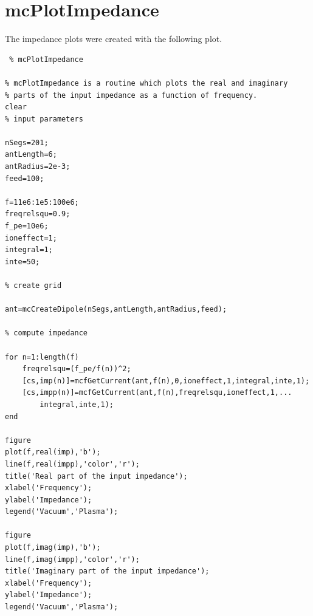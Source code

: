 \documentclass[a4paper,11pt]{thesis}
\begin{document}
\section{mcPlotImpedance}
The impedance plots were created with the following plot.
\small
\begin{verbatim}
 % mcPlotImpedance

% mcPlotImpedance is a routine which plots the real and imaginary
% parts of the input impedance as a function of frequency.
clear
% input parameters

nSegs=201;
antLength=6;
antRadius=2e-3;
feed=100;

f=11e6:1e5:100e6;
freqrelsqu=0.9;
f_pe=10e6;
ioneffect=1;
integral=1;
inte=50;

% create grid

ant=mcCreateDipole(nSegs,antLength,antRadius,feed);

% compute impedance

for n=1:length(f)
    freqrelsqu=(f_pe/f(n))^2;
    [cs,imp(n)]=mcfGetCurrent(ant,f(n),0,ioneffect,1,integral,inte,1);
    [cs,impp(n)]=mcfGetCurrent(ant,f(n),freqrelsqu,ioneffect,1,...
    	integral,inte,1);
end

figure
plot(f,real(imp),'b');
line(f,real(impp),'color','r');
title('Real part of the input impedance');
xlabel('Frequency');
ylabel('Impedance');
legend('Vacuum','Plasma');

figure
plot(f,imag(imp),'b');
line(f,imag(impp),'color','r');
title('Imaginary part of the input impedance');
xlabel('Frequency');
ylabel('Impedance');
legend('Vacuum','Plasma');
\end{verbatim}
\normalsize
\end{document}
